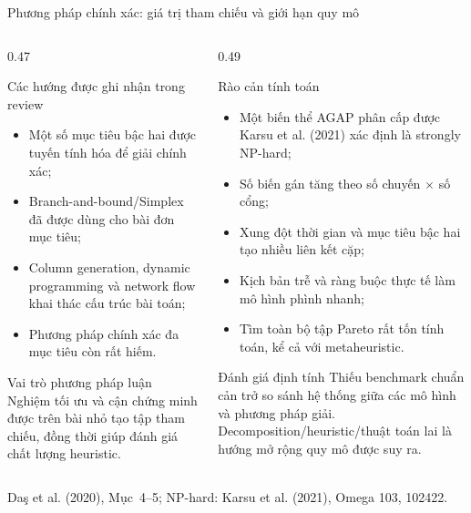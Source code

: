 \documentclass[aspectratio=169,10pt]{beamer}
\begin{document}
\begin{frame}[t]{Phương pháp chính xác: giá trị tham chiếu và giới hạn quy mô}

\footnotesize
\begin{columns}[T,onlytextwidth]
\begin{column}{0.47\textwidth}
\begin{block}{Các hướng được ghi nhận trong review}
\begin{itemize}
    \setlength{\itemsep}{0pt}
    \item Một số mục tiêu bậc hai được tuyến tính hóa để giải chính xác;
    \item Branch-and-bound/Simplex đã được dùng cho bài đơn mục tiêu;
    \item Column generation, dynamic programming và network flow khai thác cấu trúc bài toán;
    \item Phương pháp chính xác đa mục tiêu còn rất hiếm.
\end{itemize}
\end{block}

\begin{exampleblock}{Vai trò phương pháp luận}
Nghiệm tối ưu và cận chứng minh được trên bài nhỏ tạo tập tham chiếu,
đồng thời giúp đánh giá chất lượng heuristic.
\end{exampleblock}
\end{column}

\begin{column}{0.49\textwidth}
\begin{alertblock}{Rào cản tính toán}
\begin{itemize}
    \setlength{\itemsep}{0pt}
    \item Một biến thể AGAP phân cấp được Karsu et al. (2021) xác định là strongly NP-hard;
    \item Số biến gán tăng theo số chuyến $\times$ số cổng;
    \item Xung đột thời gian và mục tiêu bậc hai tạo nhiều liên kết cặp;
    \item Kịch bản trễ và ràng buộc thực tế làm mô hình phình nhanh;
    \item Tìm toàn bộ tập Pareto rất tốn tính toán, kể cả với metaheuristic.
\end{itemize}
\end{alertblock}

\begin{block}{Đánh giá định tính}
Thiếu benchmark chuẩn cản trở so sánh hệ thống giữa các mô hình và phương pháp giải.
Decomposition/heuristic/thuật toán lai là hướng mở rộng quy mô được suy ra.
\end{block}
\end{column}
\end{columns}

\vspace{-0.7ex}
\vfill
\tiny Da\c{s} et al. (2020), Mục~4--5; NP-hard: Karsu et al. (2021), Omega 103, 102422.
\end{frame}
\end{document}

